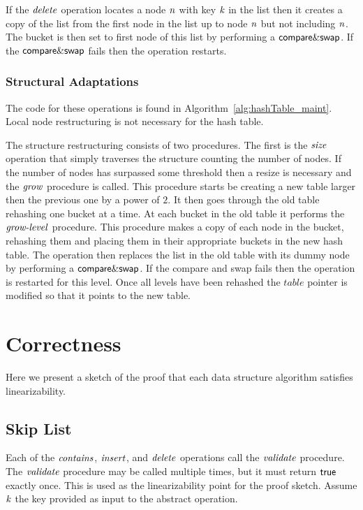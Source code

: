 If the $\ms{delete}$ operation locates a node $\ms{n}$ with key $\ms{k}$ in the list
then it creates a copy of the list from the first node in the list up to node $\ms{n}$ but not including $\ms{n}$.
The bucket is then set to first node of this list by performing a $\lit{compare\&swap}$.
If the $\lit{compare\&swap}$ fails then the operation restarts.




\subsubsection{Structural Adaptations}
The code for these operations is found in Algorithm~\ref{alg:hashTable_maint}.
Local node restructuring is not necessary for the hash table.

The structure restructuring consists of two procedures.
The first is the $\ms{size}$ operation that simply traverses the structure
counting the number of nodes.
If the number of nodes has surpassed some threshold then a resize is necessary
and the $\ms{grow}$ procedure is called.
This procedure starts be creating a new table larger then the previous one
by a power of $2$.
It then goes through the old table rehashing one bucket at a time.
At each bucket in the old table it performs the $\ms{grow-level}$ procedure.
This procedure makes a copy of each node in the bucket, rehashing them and placing them
in their appropriate buckets in the new hash table.
The operation then replaces the list in the old table with its dummy node by performing a
$\lit{compare\&swap}$.
If the compare and swap fails then the operation is restarted for this level.
Once all levels have been rehashed the $table$ pointer is modified so that it points
to the new table.

\section{Correctness}\label{sec:proof}






Here we present a sketch of the proof that each data structure algorithm satisfies linearizability.

\subsection{Skip List}

Each of the $\ms{contains}$, $\ms{insert}$, and $\ms{delete}$ operations call the $\ms{validate}$ procedure.
The $\ms{validate}$ procedure may be called multiple times, but it must return $\lit{true}$ exactly once.
This is used as the linearizability point for the proof sketch.
Assume $\ms{k}$ the key provided as input to the abstract operation.

